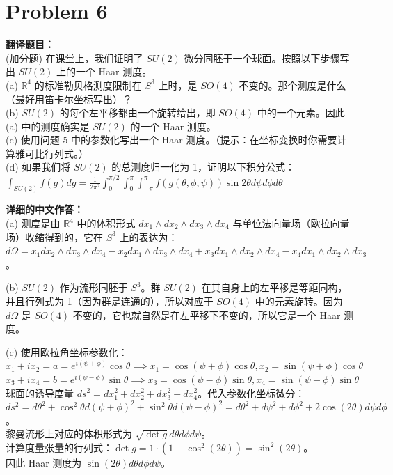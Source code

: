 \documentclass{ctexart}
\begin{document}
\vspace{2em}
\section*{Problem 6}
\textbf{翻译题目：}\\
(加分题) 在课堂上，我们证明了 $SU(2)$ 微分同胚于一个球面。按照以下步骤写出 $SU(2)$ 上的一个 Haar 测度。\\
(a) $\mathbb{R}^4$ 的标准勒贝格测度限制在 $S^3$ 上时，是 $SO(4)$ 不变的。那个测度是什么（最好用笛卡尔坐标写出）？\\
(b) $SU(2)$ 的每个左平移都由一个旋转给出，即 $SO(4)$ 中的一个元素。因此 (a) 中的测度确实是 $SU(2)$ 的一个 Haar 测度。\\
(c) 使用问题 5 中的参数化写出一个 Haar 测度。（提示：在坐标变换时你需要计算雅可比行列式。）\\
(d) 如果我们将 $SU(2)$ 的总测度归一化为 1，证明以下积分公式：\\
$\int_{SU(2)} f(g) dg = \frac{1}{2\pi^2} \int_0^{\pi/2} \int_0^\pi \int_{-\pi}^\pi f(g(\theta, \phi, \psi)) \sin 2\theta d\psi d\phi d\theta$

\vspace{1em}
\textbf{详细的中文作答：}\\
(a) 测度是由 $\mathbb{R}^4$ 中的体积形式 $dx_1 \wedge dx_2 \wedge dx_3 \wedge dx_4$ 与单位法向量场（欧拉向量场）收缩得到的，它在 $S^3$ 上的表达为：\\
$d\Omega = x_1 dx_2 \wedge dx_3 \wedge dx_4 - x_2 dx_1 \wedge dx_3 \wedge dx_4 + x_3 dx_1 \wedge dx_2 \wedge dx_4 - x_4 dx_1 \wedge dx_2 \wedge dx_3$。

(b) $SU(2)$ 作为流形同胚于 $S^3$。群 $SU(2)$ 在其自身上的左平移是等距同构，并且行列式为 1（因为群是连通的），所以对应于 $SO(4)$ 中的元素旋转。因为 $d\Omega$ 是 $SO(4)$ 不变的，它也就自然是在左平移下不变的，所以它是一个 Haar 测度。

(c) 使用欧拉角坐标参数化：\\
$x_1 + i x_2 = a = e^{i(\psi+\phi)}\cos\theta \implies x_1 = \cos(\psi+\phi)\cos\theta, x_2 = \sin(\psi+\phi)\cos\theta$\\
$x_3 + i x_4 = b = e^{i(\psi-\phi)}\sin\theta \implies x_3 = \cos(\psi-\phi)\sin\theta, x_4 = \sin(\psi-\phi)\sin\theta$\\
球面的诱导度量 $ds^2 = dx_1^2 + dx_2^2 + dx_3^2 + dx_4^2$。代入参数化坐标微分：\\
$ds^2 = d\theta^2 + \cos^2\theta d(\psi+\phi)^2 + \sin^2\theta d(\psi-\phi)^2 = d\theta^2 + d\psi^2 + d\phi^2 + 2\cos(2\theta)d\psi d\phi$。\\
黎曼流形上对应的体积形式为 $\sqrt{\det g} d\theta d\phi d\psi$。\\
计算度量张量的行列式：$\det g = 1 \cdot (1 - \cos^2(2\theta)) = \sin^2(2\theta)$。\\
因此 Haar 测度为 $\sin(2\theta) d\theta d\phi d\psi$。
\end{document}
